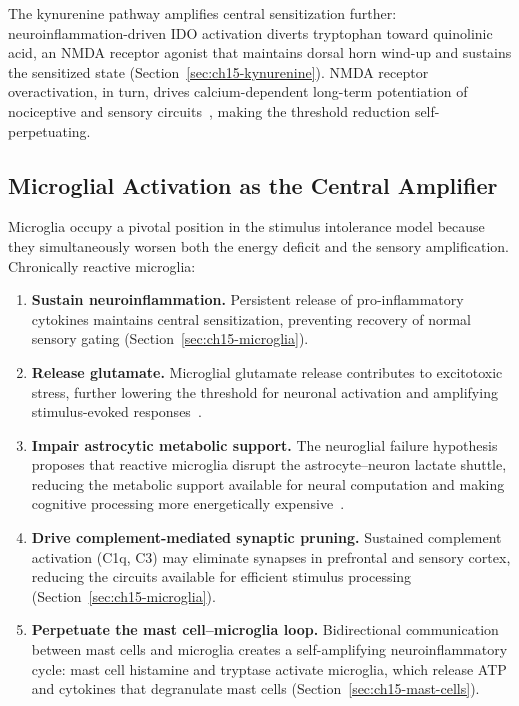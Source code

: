 The kynurenine pathway amplifies central sensitization further: neuroinflammation-driven IDO activation diverts tryptophan toward quinolinic acid, an NMDA receptor agonist that maintains dorsal horn wind-up and sustains the sensitized state (Section~\ref{sec:ch15-kynurenine}). NMDA receptor overactivation, in turn, drives calcium-dependent long-term potentiation of nociceptive and sensory circuits~\cite{Woolf2011CentralSensitization}, making the threshold reduction self-perpetuating.

\subsection{Microglial Activation as the Central Amplifier}

Microglia occupy a pivotal position in the stimulus intolerance model because they simultaneously worsen both the energy deficit and the sensory amplification. Chronically reactive microglia:

\begin{enumerate}
  \item \textbf{Sustain neuroinflammation.} Persistent release of pro-inflammatory cytokines maintains central sensitization, preventing recovery of normal sensory gating (Section~\ref{sec:ch15-microglia}).

  \item \textbf{Release glutamate.} Microglial glutamate release contributes to excitotoxic stress, further lowering the threshold for neuronal activation and amplifying stimulus-evoked responses~\cite{RenzPolster2022}.

  \item \textbf{Impair astrocytic metabolic support.} The neuroglial failure hypothesis proposes that reactive microglia disrupt the astrocyte--neuron lactate shuttle, reducing the metabolic support available for neural computation and making cognitive processing more energetically expensive~\cite{RenzPolster2022}.

  \item \textbf{Drive complement-mediated synaptic pruning.} Sustained complement activation (C1q, C3) may eliminate synapses in prefrontal and sensory cortex, reducing the circuits available for efficient stimulus processing (Section~\ref{sec:ch15-microglia}).

  \item \textbf{Perpetuate the mast cell--microglia loop.} Bidirectional communication between mast cells and microglia creates a self-amplifying neuroinflammatory cycle: mast cell histamine and tryptase activate microglia, which release ATP and cytokines that degranulate mast cells (Section~\ref{sec:ch15-mast-cells}).
\end{enumerate}


